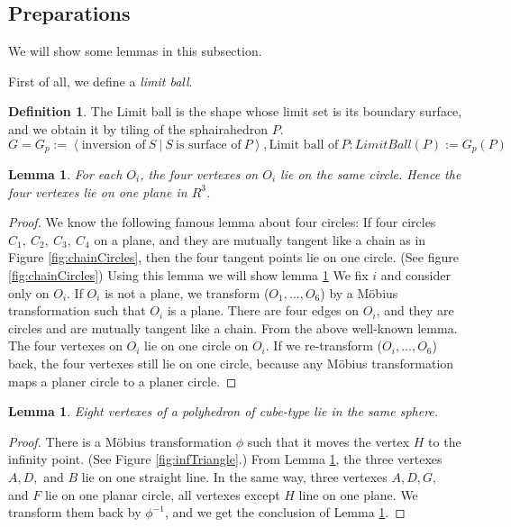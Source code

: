 \documentclass[suppldata, dvipdfmx]{interact}
\theoremstyle{plain}%
\newtheorem{lemma}[theorem]{Lemma}
\theoremstyle{definition}
\newtheorem{definition}[theorem]{Definition}
\theoremstyle{remark}
\theoremstyle{problemstyle}
\begin{document}
\subsection{Preparations}

We will show some lemmas in this subsection.

First of all, we define a \textit{limit ball}.
\begin{definition}
 The Limit ball is the shape whose limit set is its boundary surface,
 and we obtain it by tiling of the sphairahedron $P$.
$$
 G = G_p := \left< \text{inversion of}~ S~|~S~\text{is surface of}~P
 \right>,
 \text{Limit ball of}~P : LimitBall(P) := G_p(P)
$$
\end{definition}

\begin{lemma}\label{sameCircle}
For each $O_i$, the four vertexes on $O_i$ lie on the same circle.
Hence the four vertexes lie on one plane in $R^3$.
\end{lemma}

\begin{proof}
 We know the following famous lemma about four circles: If four circles 
 $C_1,~C_2,~C_3,~C_4$ on a plane, and they are mutually tangent like a
 chain as in Figure \ref{fig:chainCircles}, then the four tangent points lie on one circle.
 (See figure \ref{fig:chainCircles}) Using this lemma we will show lemma \ref{sameCircle} We fix $i$ and
 consider only on $O_i$. If $O_i$ is not a plane, we transform 
 ($O_1, ..., O_6$) by a M\"obius transformation such that $O_i$ is a
 plane. There are four edges on $O_i$, and they are circles and are
 mutually tangent like a chain. From the above well-known lemma. The
 four vertexes on $O_i$ lie on one circle on $O_i$. If we re-transform
 ($O_i, ..., O_6$) back, the four vertexes still lie on one circle,
 because any M\"obius transformation maps a planer circle to a planer circle.
\end{proof}

\begin{lemma}\label{eightVertexes}
 Eight vertexes of a polyhedron of cube-type lie in the same sphere.
\end{lemma}

\begin{proof}
 There is a M\"obius transformation $\phi$ such that it moves the vertex
 $H$ to the infinity point. (See Figure \ref{fig:infTriangle}.) From Lemma \ref{sameCircle}, the three
 vertexes $A, D,$ and $B$ lie on one straight line. In the same way,
 three vertexes $A, D, G,$ and $F$ lie on one planar circle, all vertexes
 except $H$ line on one plane. We transform them back by $\phi^{-1}$, and
 we get the conclusion of Lemma \ref{eightVertexes}.
\end{proof}
\end{document}
